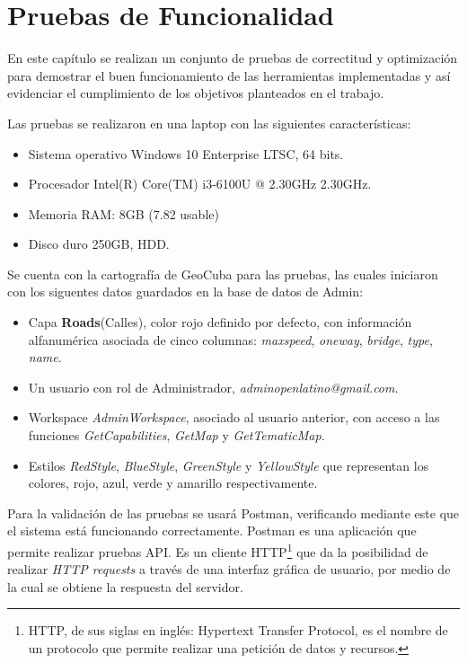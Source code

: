 \chapter{Pruebas de Funcionalidad}
En este cap\'itulo se realizan un conjunto de pruebas de correctitud y optimizaci\'on para demostrar el buen funcionamiento de las herramientas implementadas y as\'i evidenciar el cumplimiento de los objetivos planteados en el trabajo.

Las pruebas se realizaron en una laptop con las siguientes caracter\'isticas:
\begin{itemize}
\item Sistema operativo Windows 10 Enterprise LTSC, 64 bits.
\item Procesador Intel(R) Core(TM) i3-6100U @ 2.30GHz 2.30GHz.
\item Memoria RAM: 8GB (7.82 usable)
\item Disco duro 250GB, HDD.
\end{itemize}

Se cuenta con la cartograf\'ia de GeoCuba para las pruebas, las cuales iniciaron con los siguentes datos guardados en la base de datos de Admin: 
\begin{itemize}
\item Capa \textbf{Roads}(Calles), color rojo definido por defecto, con informaci\'on alfanum\'erica asociada de cinco columnas: \textit{maxspeed}, \textit{oneway}, \textit{bridge}, \textit{type}, \textit{name}.
\item Un usuario con rol de Administrador, \textit{adminopenlatino@gmail.com}.
\item Workspace \textit{AdminWorkspace}, asociado al usuario anterior, con acceso a las funciones \textit{GetCapabilities}, \textit{GetMap} y \textit{GetTematicMap}.
\item Estilos \textit{RedStyle}, \textit{BlueStyle}, \textit{GreenStyle} y \textit{YellowStyle} que representan los colores, rojo, azul, verde y amarillo respectivamente.
\end{itemize}

Para la validaci\'on de las pruebas se usar\'a Postman, verificando mediante este que el sistema est\'a funcionando correctamente. Postman es una aplicaci\'on que permite realizar pruebas API. Es un cliente HTTP\footnote{HTTP, de sus siglas en ingl\'es: Hypertext Transfer Protocol, es el nombre de un protocolo que permite realizar una petici\'on de datos y recursos.} que da la posibilidad de realizar \textit{HTTP requests} a trav\'es de una interfaz gr\'afica de usuario, por medio de la cual se obtiene la respuesta del servidor.

